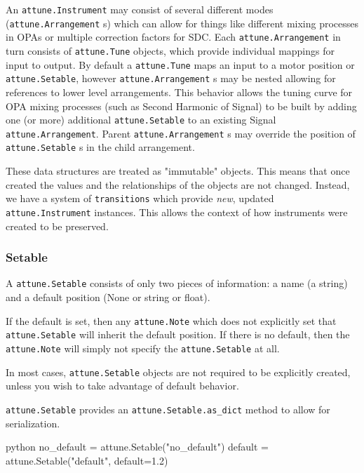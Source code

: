 An \texttt{attune.Instrument} may consist of several
different modes (\texttt{attune.Arrangement} s) which
can allow for things like different mixing processes in OPAs or multiple
correction factors for SDC. Each
\texttt{attune.Arrangement} in turn consists of
\texttt{attune.Tune} objects, which provide individual
mappings for input to output. By default a
\texttt{attune.Tune} maps an input to a motor position
or \texttt{attune.Setable}, however
\texttt{attune.Arrangement} s may be nested allowing
for references to lower level arrangements. This behavior allows the
tuning curve for OPA mixing processes (such as Second Harmonic of
Signal) to be built by adding one (or more) additional
\texttt{attune.Setable} to an existing Signal
\texttt{attune.Arrangement}. Parent
\texttt{attune.Arrangement} s may override the position
of \texttt{attune.Setable} s in the child arrangement.

These data structures are treated as "immutable" objects. This means
that once created the values and the relationships of the objects are
not changed. Instead, we have a system of \texttt{transitions} which
provide \emph{new}, updated \texttt{attune.Instrument}
instances. This allows the context of how instruments were created to be
preserved.

\hypertarget{setable}{%
\subsubsection{Setable}\label{setable}}

A \texttt{attune.Setable} consists of only two pieces
of information: a name (a string) and a default position (None or string
or float).

If the default is set, then any \texttt{attune.Note}
which does not explicitly set that
\texttt{attune.Setable} will inherit the default
position. If there is no default, then the
\texttt{attune.Note} will simply not specify the
\texttt{attune.Setable} at all.

In most cases, \texttt{attune.Setable} objects are not
required to be explicitly created, unless you wish to take advantage of
default behavior.

\texttt{attune.Setable} provides an
\texttt{attune.Setable.as\_dict} method to allow for
serialization.

\begin{codefragment}{python}
no_default = attune.Setable("no_default")
default = attune.Setable("default", default=1.2)
\end{codefragment}

